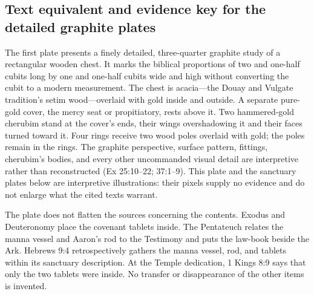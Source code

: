 \subsection{Text equivalent and evidence key for the detailed graphite plates}

The first plate presents a finely detailed, three-quarter graphite study of a
rectangular wooden chest.  It marks the biblical proportions of two and
one-half cubits long by one and one-half cubits wide and high without
converting the cubit to a modern measurement.  The chest is acacia---the Douay
and Vulgate tradition's setim wood---overlaid with gold inside and outside.  A
separate pure-gold cover, the mercy seat or propitiatory, rests above it.  Two
hammered-gold cherubim stand at the cover's ends, their wings overshadowing it
and their faces turned toward it.  Four rings receive two wood poles overlaid
with gold; the poles remain in the rings.  The graphite perspective, surface
pattern, fittings, cherubim's bodies, and every other uncommanded visual detail are
interpretive rather than reconstructed (Ex 25:10--22; 37:1--9).  This plate
and the sanctuary plates below are interpretive illustrations: their pixels
supply no evidence and do not enlarge what the cited texts warrant.

The plate does not flatten the sources concerning the contents.  Exodus and
Deuteronomy place the covenant tablets inside.  The Pentateuch relates the
manna vessel and Aaron's rod to the Testimony and puts the law-book beside the
Ark.  Hebrews 9:4 retrospectively gathers the manna vessel, rod, and tablets
within its sanctuary description.  At the Temple dedication, 1 Kings 8:9 says
that only the two tablets were inside.  No transfer or disappearance of the
other items is invented.

